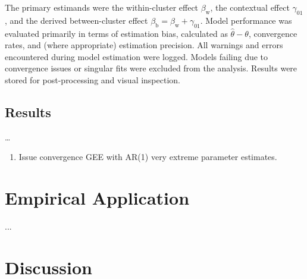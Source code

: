\documentclass[stu]{apa7}
\begin{document}
The primary estimands were the within-cluster effect \( \beta_{\text{w}} \), the contextual effect \( \gamma_{01} \), and the derived between-cluster effect \( \beta_{\text{b}} = \beta_{\text{w}} + \gamma_{01} \). Model performance was evaluated primarily in terms of estimation bias, calculated as \( \hat{\theta} - \theta \), convergence rates, and (where appropriate) estimation precision. All warnings and errors encountered during model estimation were logged. Models failing due to convergence issues or singular fits were excluded from the analysis. Results were stored for post-processing and visual inspection.

\subsection{Results}

\ldots

\begin{enumerate}
    \item Issue convergence GEE with AR(1) very extreme parameter estimates. 
\end{enumerate}








\newpage

\section{Empirical Application}

...

\section{Discussion}
\end{document}
